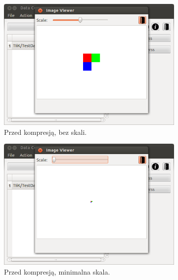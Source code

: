 \documentclass[12pt,a4paper,notitlepage]{report}
\begin{document}
\begin{figure}[H]
	\centering
	\begin{subfigure}{0.45\textwidth}
		\centering
		\includegraphics[scale=.4]{imageviewer_nor}
		\caption{Przed kompresją, bez skali.}
	\end{subfigure}\hfill
	\begin{subfigure}{0.45\textwidth}
		\centering
		\includegraphics[scale=.4]{imageviewer_min}
		\caption{Przed kompresją, minimalna skala.}
	\end{subfigure}\\[.5cm]
	\begin{subfigure}{0.45\textwidth}
		\centering

\end{subfigure}
\end{figure}
\end{document}
